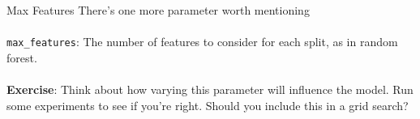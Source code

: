 %
\begin{frame}{Max Features}
There's one more parameter worth mentioning\\~\\

\texttt{max\_features}: The number of features to consider for each split, as in random forest.\\~\\

\textbf{Exercise}: Think about how varying this parameter will influence the model.  Run some experiments to see if you're right.  Should you include this in a grid search?
\end{frame}
  
  